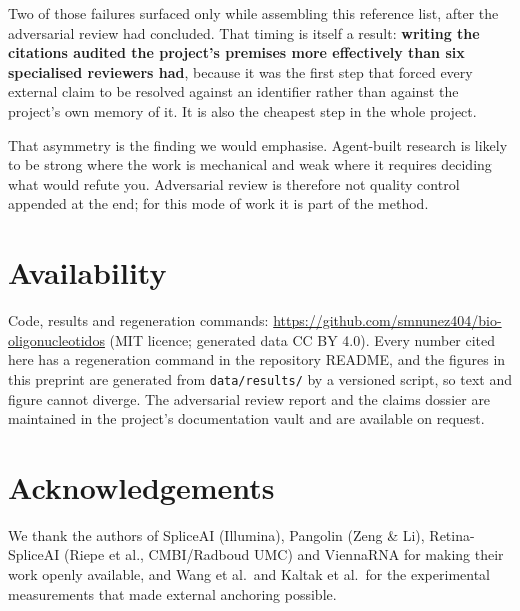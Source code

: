 \documentclass[11pt,a4paper]{article}
\begin{document}
Two of those failures surfaced only while assembling this reference list, after the adversarial
review had concluded. That timing is itself a result: \textbf{writing the citations audited the
project's premises more effectively than six specialised reviewers had}, because it was the first
step that forced every external claim to be resolved against an identifier rather than against the
project's own memory of it. It is also the cheapest step in the whole project.

That asymmetry is the finding we would emphasise. Agent-built research is likely to be strong where
the work is mechanical and weak where it requires deciding what would refute you. Adversarial review
is therefore not quality control appended at the end; for this mode of work it is part of the
method.

\section{Availability}
\label{sec:availability}

Code, results and regeneration commands: \url{https://github.com/smnunez404/bio-oligonucleotidos}
(MIT licence; generated data CC BY 4.0). Every number cited here has a regeneration command in the
repository README, and the figures in this preprint are generated from
\texttt{data/results/} by a versioned script, so text and figure cannot diverge. The adversarial
review report and the claims dossier are maintained in the project's documentation vault and are
available on request.

\section*{Acknowledgements}

We thank the authors of SpliceAI (Illumina), Pangolin (Zeng \& Li), Retina-SpliceAI
(Riepe et al., CMBI/Radboud UMC) and ViennaRNA for making their work openly available, and Wang
et al.\ and Kaltak et al.\ for the experimental measurements that made external anchoring possible.
\end{document}
